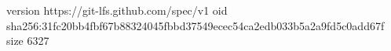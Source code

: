 version https://git-lfs.github.com/spec/v1
oid sha256:31fc20bb4fbf67b88324045fbbd37549ecec54ca2edb033b5a2a9fd5c0add67f
size 6327
